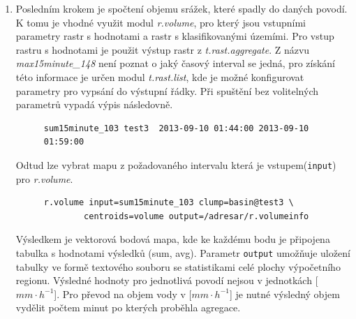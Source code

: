 \documentclass[a4paper,12pt,oneside]{report}
\begin{document}
\begin{enumerate}
\item Posledním krokem je spočtení objemu srážek, které spadly do daných povodí. K tomu je vhodné využit  modul \textit{r.volume}, pro který jsou vstupními parametry rastr s hodnotami a rastr s klasifikovanými územími. Pro vstup rastru s hodnotami je použit výstup  rastr z \textit{t.rast.aggregate}. Z názvu \textit{max15minute\_148} není poznat o jaký časový interval se jedná, pro získání této informace je určen modul \textit{t.rast.list}, kde je možné konfigurovat parametry pro vypsání do výstupní řádky. Při spuštění bez volitelných parametrů vypadá výpis následovně.
\begin{figure}[h!]
\begin{footnotesize}
\lstset{extendedchars=false,
escapeinside=''}
\begin{lstlisting}[style=mybash]
sum15minute_103	test3  2013-09-10 01:44:00 2013-09-10 01:59:00
\end{lstlisting}
\end{footnotesize} 
\end{figure}

Odtud lze vybrat mapu z požadovaného intervalu která je vstupem(\texttt{input}) pro \textit{r.volume}. 

\begin{figure}[h!]
\begin{footnotesize}
\lstset{extendedchars=false,
escapeinside=''}
\begin{lstlisting}[style=mybash]
r.volume input=sum15minute_103 clump=basin@test3 \
        centroids=volume output=/adresar/r.volumeinfo
\end{lstlisting}
\end{footnotesize} 
\end{figure}

Výsledkem je vektorová bodová mapa, kde ke každému bodu je připojena tabulka s hodnotami výsledků (sum, avg). Parametr \texttt{output} umožňuje uložení tabulky ve formě textového souboru se statistikami celé plochy výpočetního regionu. Výsledné hodnoty pro jednotlivá povodí nejsou v jednotkách  [$mm \cdot h^{-1}$]. Pro převod na objem vody v [$mm \cdot h^{-1}$] je nutné výsledný objem vydělit počtem minut po kterých proběhla agregace.

\end{enumerate} 
\end{document}
